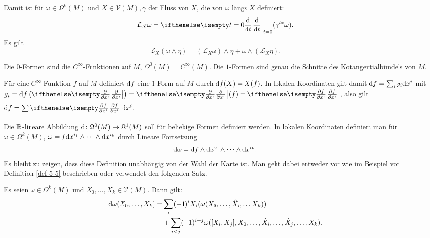 Damit ist für $\omega \in \Omega^k(M)$ und $X \in \mathcal V(M), \gamma $ der Fluss von $X$, die  von $\omega$ längs $X$ definiert:
	\[ \mathcal L_X\omega = \difffrac[t=0]{}{t}(\gamma^{t*}\omega). \]
Es gilt 
	\[ \mathcal L_X(\omega \wedge \eta) = (\mathcal L_X\omega) \wedge \eta + \omega \wedge (\mathcal L_X\eta). \]

Die $0$-Formen sind die $C^{\infty}$-Funktionen auf $M$, $\Omega^0(M) = C^{\infty}(M)$. Die $1$-Formen sind genau die Schnitte des Kotangentialbündels von $M$.

Für eine $C^{\infty}$-Funktion $f$ auf $M$ definiert $\mathrm{d} f$ eine $1$-Form auf $M$ durch $\mathrm{d} f (X) = X(f)$.
In lokalen Koordinaten gilt damit $\mathrm{d} f = \sum_ig_i\mathrm{d} x^i$ mit $g_i = \dop f\left(\pdifffrac{}{x^i}\right) = \pdifffrac{}{x^i}(f) = \pdifffrac{f}{x^i}$, also gilt $\dop f = \sum \pdifffrac{f}{x^i}\dop x^i$.

Die $\operatorname{\mathbb{R}}$-lineare Abbildung $\mathrm{d} \colon \Omega^0(M) \to \Omega^1(M)$ soll für beliebige Formen definiert werden.
In lokalen Koordinaten definiert man für $\omega \in \Omega^k(M)$, $\omega = f \mathrm{d} x^{i_1} \wedge \cdots \wedge \mathrm{d} x^{i_k}$ durch Lineare Fortsetzung
	\[ \mathrm{d} \omega = \mathrm{d} f \wedge \mathrm{d} x^{i_1} \wedge \cdots \wedge \mathrm{d} x^{i_k}. \]
Es bleibt zu zeigen, dass diese Definition unabhängig von der Wahl der Karte ist. Man geht dabei entweder vor wie im Beispiel vor Definition \ref{def-5-5} beschrieben oder verwendet den folgenden Satz.

\begin{Satz}
  Es seien $\omega \in \Omega^k(M)$ und $X_0, \ldots, X_k \in \mathcal V(M)$.
  Dann gilt:
  \begin{align*}
    \mathrm{d} \omega(X_0, \ldots, X_k) = & \sum_i(-1)^iX_i(\omega(X_0, \ldots, \hat X_i, \ldots X_k)) \\
    & + \sum_{i<j}(-1)^{i+j}\omega([X_i,X_j], X_0, \ldots, \hat X_i, \ldots, \hat X_j, \ldots, X_k).
  \end{align*}
\end{Satz}

